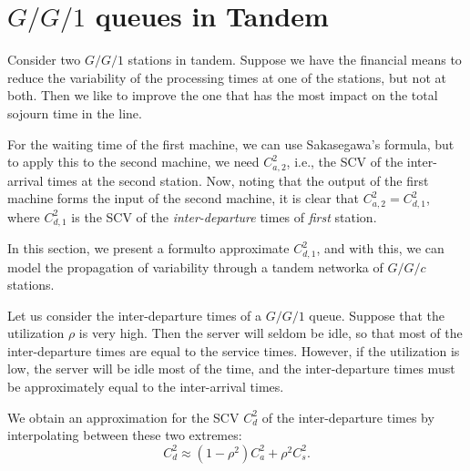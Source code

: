 


\section{$G/G/1$ queues in Tandem}
\label{sec:tandem-queues}


Consider two $G/G/1$ stations in tandem.
Suppose we have the financial means to reduce the variability of the processing times at  one of the stations, but not at both.
Then we like to improve the one that has the most impact on the total sojourn time in the line.

For the waiting time of the first machine, we can use Sakasegawa's formula, but to apply this to the second machine, we need $C^2_{a,2}$, i.e., the SCV of the inter-arrival times at the second station.
Now, noting that the output of the first machine forms the input of the second machine, it is clear that $C^2_{a,2}=C^2_{d,1}$, where $C^2_{d,1}$ is the SCV of the \emph{inter-departure} times of \emph{first} station.

In this section, we  present a formulto approximate $C^2_{d,1}$, and with this, we can model the propagation of variability through a tandem networka
  of $G/G/c$ stations.



Let us consider the inter-departure times of a $G/G/1$ queue.
Suppose that the  utilization $\rho$ is very high.
Then the server will seldom be idle, so that most of the inter-departure times are equal to the service times.
However, if the utilization is low, the server will be idle most of the time, and the inter-departure times must be approximately equal to the inter-arrival times.

We obtain an  approximation for the SCV $C_{d}^2$ of the inter-departure times by  interpolating between these two extremes:
\begin{equation} \label{eq:40}
 C_{d}^2 \approx  (1-\rho^2) C_{a}^2 + \rho^2 C_{s}^2.
\end{equation}

